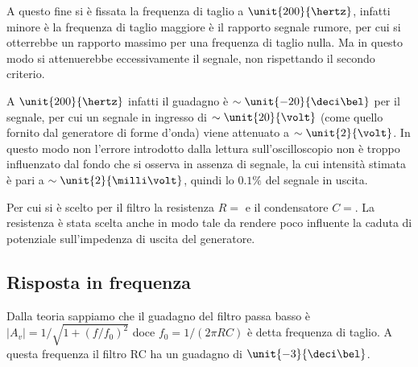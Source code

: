 \documentclass[10pt,a4paper]{article}
\begin{document}
A questo fine si è fissata la frequenza di taglio a $\unit{200}{\hertz}$, infatti minore è la frequenza di taglio maggiore è il rapporto segnale rumore, per cui si otterrebbe un rapporto massimo per una frequenza di taglio nulla. Ma in questo modo si attenuerebbe eccessivamente il segnale, non rispettando il secondo criterio.

A $\unit{200}{\hertz}$ infatti il guadagno è $\sim \unit{-20}{\deci\bel}$ per il segnale, per cui un segnale in ingresso di $\sim \unit{20}{\volt}$ (come quello fornito dal generatore di forme d'onda) viene attenuato a $\sim \unit{2}{\volt}$. In questo modo non l'errore introdotto dalla lettura sull'oscilloscopio non è troppo influenzato dal fondo che si osserva in assenza di segnale, la cui intensità stimata è pari a $\sim \unit{2}{\milli\volt}$, quindi lo $0.1\%$ del segnale in uscita.

Per cui si è scelto per il filtro la resistenza $R = $ e il condensatore $C = $. La resistenza è stata scelta anche in modo tale da rendere poco influente la caduta di potenziale sull'impedenza di uscita del generatore. 

\subsection{Risposta in frequenza}
Dalla teoria sappiamo che il guadagno del filtro passa basso è $|A_v|=1/\sqrt{1+(f/f_0)^2}$ doce $f_0 = 1/(2 \pi RC)$ è detta frequenza di taglio. A questa frequenza il filtro RC ha un guadagno di $\unit{-3}{\deci\bel}$.
\end{document}
